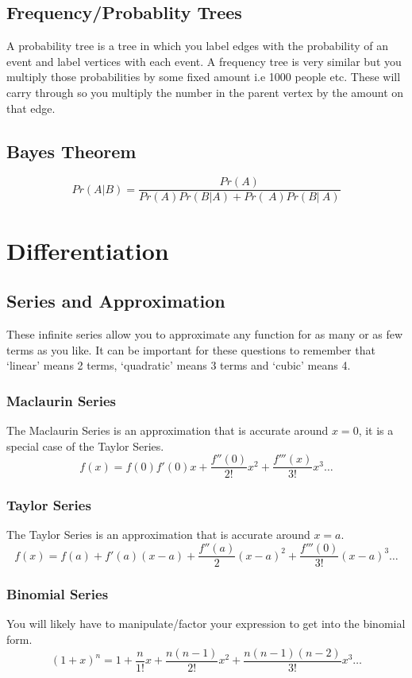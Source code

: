 \documentclass[12pt] {article}
\begin{document}
\subsection*{Frequency/Probablity Trees}
A probability tree is a tree in which you label edges with the probability of an event
and label vertices with each event. A frequency tree is very similar but you multiply
those probabilities by some fixed amount i.e 1000 people etc. These will carry through so you
multiply the number in the parent vertex by the amount on that edge. 

\subsection*{Bayes Theorem}
\begin{equation*}
  Pr(A \vert B) = \frac{Pr(A)}{Pr(A)Pr(B \vert A) + Pr(~A)Pr(B \vert ~A)}
\end{equation*}

\section{Differentiation}
\subsection*{Series and Approximation}
These infinite series allow you to approximate any function for as many or as few terms as you like.
It can be important for these questions to remember that `linear' means 2 terms, `quadratic' means 3 terms and `cubic' means 4.
\subsubsection*{Maclaurin Series}
The Maclaurin Series is an approximation that is accurate around $x=0$, it is a special case of the Taylor Series.
\begin{equation*}
  f(x)=f(0)f'(0)x+\frac{f''(0)}{2!}x^2+\frac{f'''(x)}{3!}x^3 \dotsc
\end{equation*}
\subsubsection*{Taylor Series}
The Taylor Series is an approximation that is accurate around $x=a$.
\begin{equation*}
  f(x) = f(a) + f'(a)(x-a) + \frac{f''(a)}{2}(x-a)^2 + \frac{f'''(0)}{3!}(x-a)^3 \dotsc
\end{equation*}
\subsubsection*{Binomial Series}
You will likely have to manipulate/factor your expression to get into the binomial form.
\begin{equation*}
  (1+x)^n = 1 + \frac{n}{1!}x + \frac{n(n-1)}{2!}x^2 + \frac{n(n-1)(n-2)}{3!}x^3 \dotsc
\end{equation*}
\end{document}
